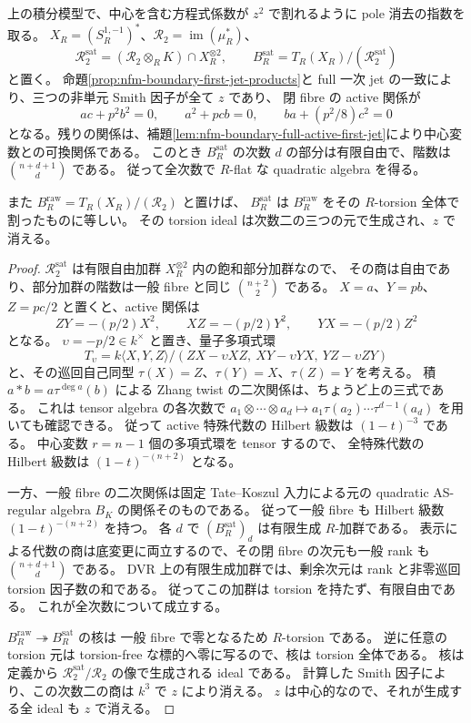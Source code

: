 \begin{proposition}[飽和した二次関係が定める全次数の平坦族]
\label{prop:nfm-boundary-saturated-quadratic-flat}
上の積分模型で、中心を含む方程式係数が $z^2$ で割れるように
pole 消去の指数を取る。
$X_R=(S_R^{1,-1})^*$、$\mathcal R_2=\operatorname{im}(\mu_R^*)$、
\[
 \mathcal R_2^{\mathrm{sat}}
   =(\mathcal R_2\otimes_RK)\cap X_R^{\otimes2},
 \qquad
 B_R^{\mathrm{sat}}=T_R(X_R)/(\mathcal R_2^{\mathrm{sat}})
\]
と置く。
命題\ref{prop:nfm-boundary-first-jet-products}と full 一次 jet の一致により、三つの非単元 Smith 因子が全て $z$ であり、
閉 fibre の active 関係が
\[
 ac+p^2b^2=0,\qquad a^2+pcb=0,\qquad ba+(p^2/8)c^2=0
\]
となる。残りの関係は、補題\ref{lem:nfm-boundary-full-active-first-jet}により中心変数との可換関係である。
このとき $B_R^{\mathrm{sat}}$ の次数 $d$ の部分は有限自由で、階数は
$\binom{n+d+1}{d}$ である。
従って全次数で $R$-flat な quadratic algebra を得る。

また $B_R^{\mathrm{raw}}=T_R(X_R)/(\mathcal R_2)$ と置けば、
$B_R^{\mathrm{sat}}$ は $B_R^{\mathrm{raw}}$ をその $R$-torsion 全体で割ったものに等しい。
その torsion ideal は次数二の三つの元で生成され、$z$ で消える。
\end{proposition}

\begin{proof}
$\mathcal R_2^{\mathrm{sat}}$ は有限自由加群 $X_R^{\otimes2}$ 内の飽和部分加群なので、
その商は自由であり、部分加群の階数は一般 fibre と同じ $\binom{n+2}{2}$ である。
$X=a$、$Y=pb$、$Z=pc/2$ と置くと、active 関係は
\[
 ZY=-(p/2)X^2,\qquad XZ=-(p/2)Y^2,\qquad YX=-(p/2)Z^2
\]
となる。
$\upsilon=-p/2\in k^\times$ と置き、量子多項式環
\[
 T_{\upsilon}=k\langle X,Y,Z\rangle/
       (ZX-\upsilon XZ,\ XY-\upsilon YX,\ YZ-\upsilon ZY)
\]
と、その巡回自己同型 $\tau(X)=Z$、$\tau(Y)=X$、$\tau(Z)=Y$ を考える。
積 $a*b=a\tau^{\deg a}(b)$ による Zhang twist の二次関係は、ちょうど上の三式である。
これは tensor algebra の各次数で
$a_1\otimes\cdots\otimes a_d\mapsto
 a_1\tau(a_2)\cdots\tau^{d-1}(a_d)$ を用いても確認できる。
従って active 特殊代数の Hilbert 級数は $(1-t)^{-3}$ である。
中心変数 $r=n-1$ 個の多項式環を tensor するので、
全特殊代数の Hilbert 級数は $(1-t)^{-(n+2)}$ となる。

一方、一般 fibre の二次関係は固定 Tate--Koszul 入力による元の
quadratic AS-regular algebra $B_K$ の関係そのものである。
従って一般 fibre も Hilbert 級数 $(1-t)^{-(n+2)}$ を持つ。
各 $d$ で $(B_R^{\mathrm{sat}})_d$ は有限生成 $R$-加群である。
表示による代数の商は底変更に両立するので、その閉 fibre の次元も一般 rank も
$\binom{n+d+1}{d}$ である。
DVR 上の有限生成加群では、剰余次元は rank と非零巡回 torsion 因子数の和である。
従ってこの加群は torsion を持たず、有限自由である。
これが全次数について成立する。

$B_R^{\mathrm{raw}}\twoheadrightarrow B_R^{\mathrm{sat}}$ の核は
一般 fibre で零となるため $R$-torsion である。
逆に任意の torsion 元は torsion-free な標的へ零に写るので、核は torsion 全体である。
核は定義から $\mathcal R_2^{\mathrm{sat}}/\mathcal R_2$ の像で生成される ideal である。
計算した Smith 因子により、この次数二の商は $k^3$ で $z$ により消える。
$z$ は中心的なので、それが生成する全 ideal も $z$ で消える。
\end{proof}

